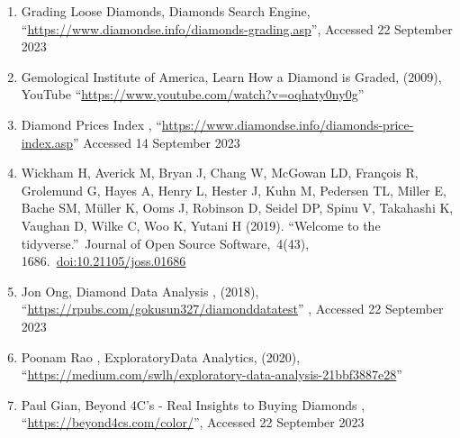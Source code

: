 \documentclass[
]{article}
\begin{document}
\begin{enumerate}
\def\labelenumi{\arabic{enumi})}
\item
  Grading Loose Diamonds, Diamonds Search Engine,
  ``\url{https://www.diamondse.info/diamonds-grading.asp}'', Accessed 22
  September 2023
\item
  Gemological Institute of America, Learn How a Diamond is Graded,
  (2009), YouTube ``\url{https://www.youtube.com/watch?v=oqhaty0ny0g}''
\item
  Diamond Prices Index ,
  ``\url{https://www.diamondse.info/diamonds-price-index.asp}'' Accessed
  14 September 2023
\item
  Wickham H, Averick M, Bryan J, Chang W, McGowan LD, François R,
  Grolemund G, Hayes A, Henry L, Hester J, Kuhn M, Pedersen TL, Miller
  E, Bache SM, Müller K, Ooms J, Robinson D, Seidel DP, Spinu V,
  Takahashi K, Vaughan D, Wilke C, Woo K, Yutani H (2019). ``Welcome to
  the tidyverse.''~Journal of Open Source Software,~4(43),
  1686.~\url{doi:10.21105/joss.01686}
\item
  Jon Ong, Diamond Data Analysis , (2018),
  ``\url{https://rpubs.com/gokusun327/diamonddatatest}'' , Accessed 22
  September 2023
\item
  Poonam Rao , ExploratoryData Analytics, (2020),
  ``\url{https://medium.com/swlh/exploratory-data-analysis-21bbf3887e28}''
\item
  Paul Gian, Beyond 4C's - Real Insights to Buying Diamonds ,
  ``\url{https://beyond4cs.com/color/}'', Accessed 22 September 2023
\end{enumerate}
\end{document}
